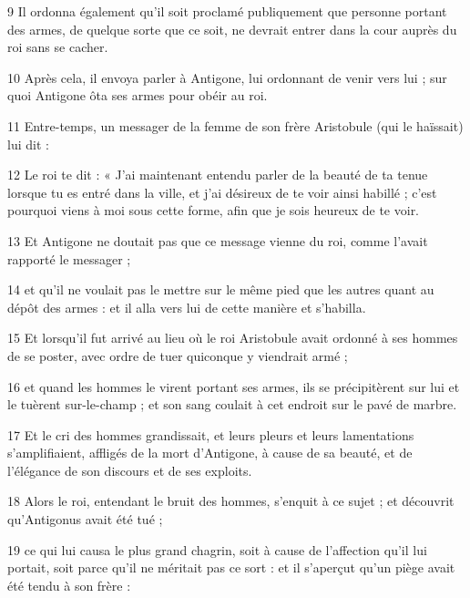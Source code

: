\par 9 Il ordonna également qu'il soit proclamé publiquement que personne portant des armes, de quelque sorte que ce soit, ne devrait entrer dans la cour auprès du roi sans se cacher.

\par 10 Après cela, il envoya parler à Antigone, lui ordonnant de venir vers lui ; sur quoi Antigone ôta ses armes pour obéir au roi.

\par 11 Entre-temps, un messager de la femme de son frère Aristobule (qui le haïssait) lui dit :

\par 12 Le roi te dit : « J'ai maintenant entendu parler de la beauté de ta tenue lorsque tu es entré dans la ville, et j'ai désireux de te voir ainsi habillé ; c'est pourquoi viens à moi sous cette forme, afin que je sois heureux de te voir.

\par 13 Et Antigone ne doutait pas que ce message vienne du roi, comme l'avait rapporté le messager ;

\par 14 et qu'il ne voulait pas le mettre sur le même pied que les autres quant au dépôt des armes : et il alla vers lui de cette manière et s'habilla.

\par 15 Et lorsqu'il fut arrivé au lieu où le roi Aristobule avait ordonné à ses hommes de se poster, avec ordre de tuer quiconque y viendrait armé ;

\par 16 et quand les hommes le virent portant ses armes, ils se précipitèrent sur lui et le tuèrent sur-le-champ ; et son sang coulait à cet endroit sur le pavé de marbre.

\par 17 Et le cri des hommes grandissait, et leurs pleurs et leurs lamentations s'amplifiaient, affligés de la mort d'Antigone, à cause de sa beauté, et de l'élégance de son discours et de ses exploits.

\par 18 Alors le roi, entendant le bruit des hommes, s'enquit à ce sujet ; et découvrit qu'Antigonus avait été tué ;

\par 19 ce qui lui causa le plus grand chagrin, soit à cause de l'affection qu'il lui portait, soit parce qu'il ne méritait pas ce sort : et il s'aperçut qu'un piège avait été tendu à son frère :

